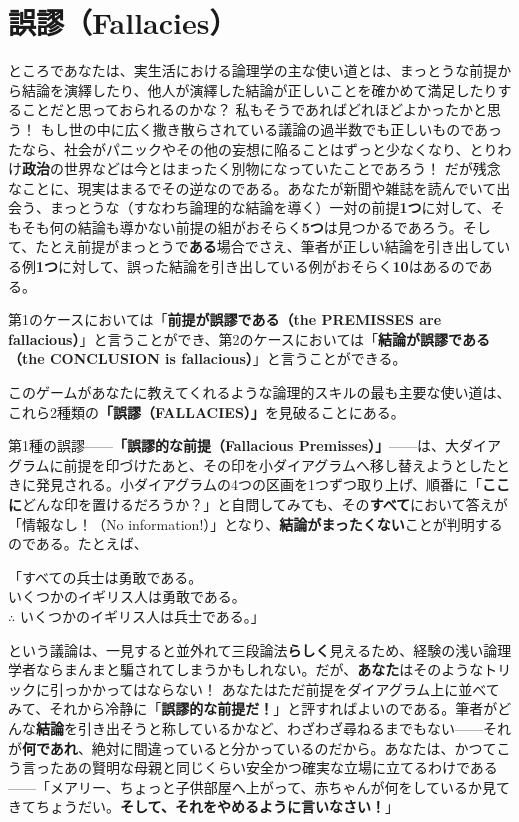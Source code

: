 \documentclass[a4paper,11pt,openany]{ltjsbook}
\begin{document}
\section{誤謬（Fallacies）}

ところであなたは、実生活における論理学の主な使い道とは、まっとうな前提から結論を演繹したり、他人が演繹した結論が正しいことを確かめて満足したりすることだと思っておられるのかな？ 私もそうであればどれほどよかったかと思う！ もし世の中に広く撒き散らされている議論の過半数でも正しいものであったなら、社会がパニックやその他の妄想に陥ることはずっと少なくなり、とりわけ\textbf{政治}の世界などは今とはまったく別物になっていたことであろう！ だが残念なことに、現実はまるでその逆なのである。あなたが新聞や雑誌を読んでいて出会う、まっとうな（すなわち論理的な結論を導く）一対の前提\textbf{1つ}に対して、そもそも何の結論も導かない前提の組がおそらく\textbf{5つ}は見つかるであろう。そして、たとえ前提がまっとうで\textbf{ある}場合でさえ、筆者が正しい結論を引き出している例\textbf{1つ}に対して、誤った結論を引き出している例がおそらく\textbf{10}はあるのである。

第1のケースにおいては「\textbf{前提が誤謬である（the PREMISSES are fallacious）}」と言うことができ、第2のケースにおいては「\textbf{結論が誤謬である（the CONCLUSION is fallacious）}」と言うことができる。

このゲームがあなたに教えてくれるような論理的スキルの最も主要な使い道は、これら2種類の\textbf{「誤謬（FALLACIES）」}を見破ることにある。

第1種の誤謬——\textbf{「誤謬的な前提（Fallacious Premisses）」}——は、大ダイアグラムに前提を印づけたあと、その印を小ダイアグラムへ移し替えようとしたときに発見される。小ダイアグラムの4つの区画を1つずつ取り上げ、順番に「\textbf{ここに}どんな印を置けるだろうか？」と自問してみても、その\textbf{すべて}において答えが「情報なし！（No information!）」となり、\textbf{結論がまったくない}ことが判明するのである。たとえば、
\begin{center}
「すべての兵士は勇敢である。\\
いくつかのイギリス人は勇敢である。\\
$\therefore$ いくつかのイギリス人は兵士である。」
\end{center}
という議論は、一見すると並外れて三段論法\textbf{らしく}見えるため、経験の浅い論理学者ならまんまと騙されてしまうかもしれない。だが、\textbf{あなた}はそのようなトリックに引っかかってはならない！ あなたはただ前提をダイアグラム上に並べてみて、それから冷静に「\textbf{誤謬的な前提だ！}」と評すればよいのである。筆者がどんな\textbf{結論}を引き出そうと称しているかなど、わざわざ尋ねるまでもない——それが\textbf{何であれ}、絶対に間違っていると分かっているのだから。あなたは、かつてこう言ったあの賢明な母親と同じくらい安全かつ確実な立場に立てるわけである——「メアリー、ちょっと子供部屋へ上がって、赤ちゃんが何をしているか見てきてちょうだい。\textbf{そして、それをやめるように言いなさい！}」
\end{document}
